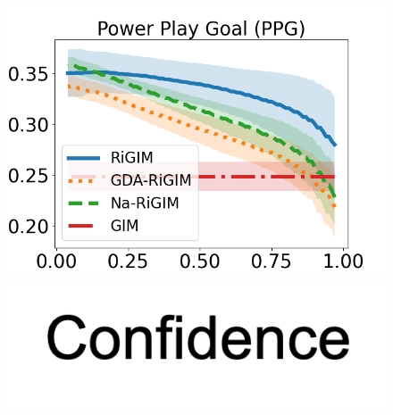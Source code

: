 \documentclass{article}
\begin{document}
\begin{figure}[htbp]
\begin{minipage}{0.16\textwidth}
    \includegraphics[scale=0.17]{figures/risk_curve_PPG_shadow.png}\par
    \vspace{-0.05in}
    \includegraphics[scale=0.15]{figures/confidence_x_label.png}
    \end{minipage}
    \begin{minipage}{0.015\textwidth}
    \centering

\end{minipage}
\end{figure}
\end{document}
